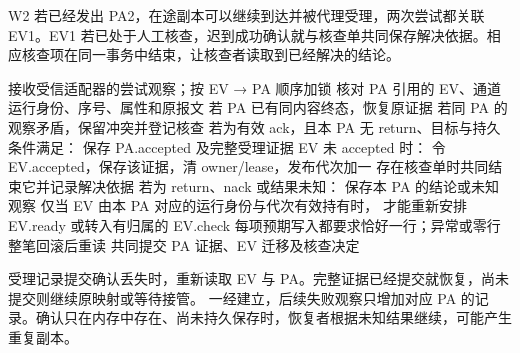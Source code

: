 
W2 若已经发出 PA2，在途副本可以继续到达并被代理受理，两次尝试都关联 EV1。EV1 若已处于人工核查，迟到成功确认就与核查单共同保存解决依据。相应核查项在同一事务中结束，让核查者读取到已经解决的结论。

\begin{BookCode}
接收受信适配器的尝试观察；按 EV → PA 顺序加锁
核对 PA 引用的 EV、通道运行身份、序号、属性和原报文
若 PA 已有同内容终态，恢复原证据
若同 PA 的观察矛盾，保留冲突并登记核查
若为有效 ack，且本 PA 无 return、目标与持久条件满足：
    保存 PA.accepted 及完整受理证据
    EV 未 accepted 时：
        令 EV.accepted，保存该证据，清 owner/lease，发布代次加一
        存在核查单时共同结束它并记录解决依据
若为 return、nack 或结果未知：
    保存本 PA 的结论或未知观察
    仅当 EV 由本 PA 对应的运行身份与代次有效持有时，
        才能重新安排 EV.ready 或转入有归属的 EV.check
每项预期写入都要求恰好一行；异常或零行整笔回滚后重读
共同提交 PA 证据、EV 迁移及核查决定
\end{BookCode}

受理记录提交确认丢失时，重新读取 EV 与 PA。完整证据已经提交就恢复，尚未提交则继续原映射或等待接管。 一经建立，后续失败观察只增加对应 PA 的记录。确认只在内存中存在、尚未持久保存时，恢复者根据未知结果继续，可能产生重复副本。
